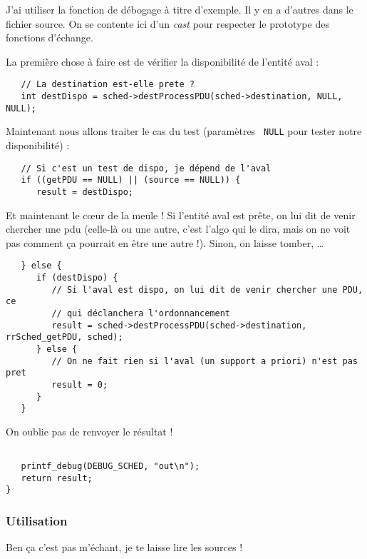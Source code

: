 \documentclass{article}
\begin{document}
   J'ai utiliser la fonction de débogage à titre d'exemple. Il y en a
d'autres dans le fichier source. On se contente ici d'un {\em cast}
pour respecter le prototype des fonctions d'échange.

   La première chose à faire est de vérifier la disponibilité de
l'entité aval :

\begin{verbatim}
   // La destination est-elle prete ?
   int destDispo = sched->destProcessPDU(sched->destination, NULL, NULL);
\end{verbatim}

   Maintenant nous allons traiter le cas du test (paramètres {\tt
NULL} pour tester notre disponibilité) :

\begin{verbatim}
   // Si c'est un test de dispo, je dépend de l'aval
   if ((getPDU == NULL) || (source == NULL)) {
      result = destDispo;
\end{verbatim}

   Et maintenant le c\oe{}ur de la meule ! Si l'entité aval est prête,
on lui dit de venir chercher une {\sc pdu} (celle-là ou une autre,
c'est l'algo qui le dira, mais on ne voit pas comment ça pourrait en
être une autre !). Sinon, on laisse tomber, \ldots

\begin{verbatim}
   } else {
      if (destDispo) {
         // Si l'aval est dispo, on lui dit de venir chercher une PDU, ce
         // qui déclanchera l'ordonnancement
         result = sched->destProcessPDU(sched->destination, rrSched_getPDU, sched);
      } else {
         // On ne fait rien si l'aval (un support a priori) n'est pas pret
         result = 0;
      }
   }
\end{verbatim}

   On oublie pas de renvoyer le résultat !

\begin{verbatim}

   printf_debug(DEBUG_SCHED, "out\n");
   return result;
}
\end{verbatim}

%
\subsubsection{Utilisation}

   Ben ça c'est pas m'échant, je te laisse lire les sources !
\end{document}
